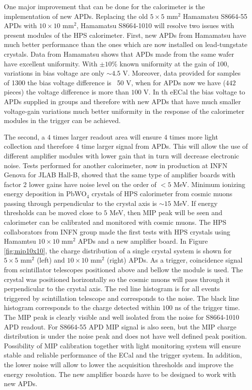 One major improvement that can be done for the calorimeter is the implementation of new APDs. Replacing the old $5\times 5$ mm$^2$ Hamamatsu S8664-55 APDs with $10\times 10$ mm$^2$, Hamamatsu S8664-1010 will resolve two issues with present modules of the HPS calorimeter. First, new APDs from Hamamatsu have much better performance than the ones which are now installed on lead-tungstate crystals. Data from Hamamatsu shows that APDs made from the same wafer have excellent uniformity. With $\pm 10\%$ known uniformity at the gain of $100$, variations in bias voltage are only $\sim 4.5$ V. Moreover, data provided for samples of 1300 the bias voltage difference is ~50 V, when for APDs now we have ($442$ pieces) the voltage difference is more than $100$ V. In th eECal the bias voltage to APDs supplied in  groups and therefore with new APDs that have much smaller voltage-gain variations much better uniformity in the response of the calorimeter modules in the trigger can be achieved. 

The second, a $4$ times larger readout area will ensure $4$ times more light collection and therefore $4$ time larger signal from APDs. This will allow the use of different amplifier modules with lower gain that in turn will decrease electronic noise. Tests performed for another calorimeter, now in production at INFN Genova for JLAB Hall-B, showed that the same type of amplifier boards with factor 2 lower gains have noise level on the order of $<5$ MeV. Minimum ionizing energy deposition in PbWO$_4$ crystals of HPS calorimeter from cosmic muons passing through perpendicular to the crystal axis is $\sim 15$ MeV. If energy thresholds can be moved close to $5$ MeV, then MIP peak will be seen and calorimeter can be calibrated and monitored with cosmic muons. The HPS collaborators from INFN group made the first tests with HPS crystals using Hamamtsu $10\times 10$ mm$^2$ APDs and a new amplifier board. In Figure \ref{fig:mip10x10}, the charge distribution of a single crystal system is shown for $5\times 5$ mm$^2$ (left) and $10\times 10$ mm$^2$ (right) APDs. As a trigger, coincidence signal from scintillator telescopes positioned above and bellow the module is used. The crystal was positioned horizontally so the cosmic muons will pass through it perpendicular to the crystal axis. The red line histogram is for all events triggered by scintillation telescope and corresponds to the noise. The black line histogram corresponds to the charge detected within $100$ ns of the trigger time. The MIP peak is clearly visible and well isolated from the noise for S8664-1010 APD readout. For  S8664-55 APD MIP signal is also seen, but the MIP charge distribution is under the noise peak and does not have well defined peak position. Possibility of MIP calibration together with light monitoring system will ensure stable and reliable performance of the ECal and the trigger system. In addition, the lower noise will allow to lower the acquisition thresholds and improve the energy resolution. The new amplifier boards have to be designed to work with new APDs. 

